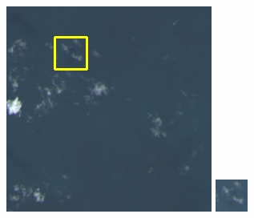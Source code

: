 \documentclass[10pt]{ctexart}
\begin{document}
\begin{multicols}{2}
\begin{figure}[H]
{\begin{minipage}[b]{0.15\linewidth}
            \includegraphics[width=1\linewidth]{../log/spoon2/cut2/LC81620432014072LGN00_16329_color.jpg}\vspace{4pt}
            \includegraphics[width=1\linewidth]{../log/spoon2/cut2/tmp_cut_LC81620432014072LGN00_16329_color.jpg}\vspace{4pt}

\end{minipage}}
\end{figure}
\end{multicols}
\end{document}
